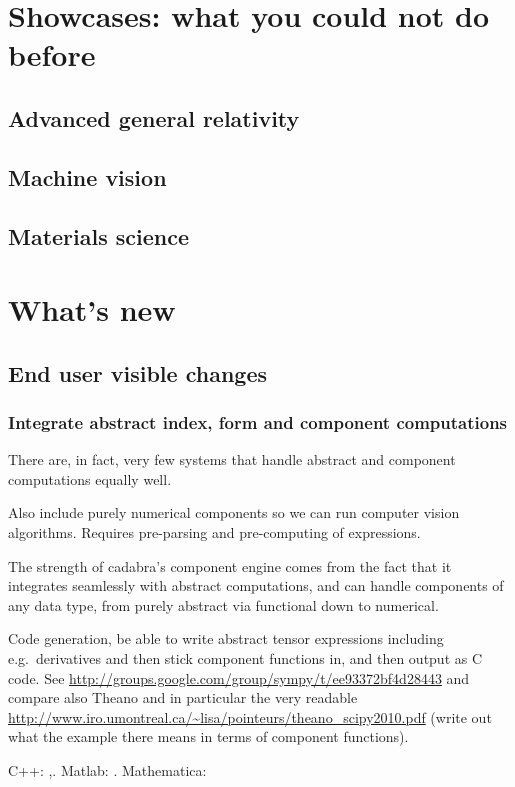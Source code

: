 \documentclass[11pt]{article}
\begin{document}
\section{Showcases: what you could not do before}
\subsection{Advanced general relativity}
\subsection{Machine vision}
\subsection{Materials science}

\section{What's new}
\subsection{End user visible changes}
\subsubsection{Integrate abstract index, form and component computations}

There are, in fact, very few systems that handle abstract and
component computations equally well.

Also include purely numerical components so we can run computer vision
algorithms. Requires pre-parsing and pre-computing of expressions.

The strength of cadabra's component engine comes from the fact that it
integrates seamlessly with abstract computations, and can handle
components of any data type, from purely abstract via functional down
to numerical.

Code generation, be able to write abstract tensor expressions
including e.g.~derivatives and then stick component functions in, and
then output as C code. See
\url{http://groups.google.com/group/sympy/t/ee93372bf4d28443}
and compare also Theano and in particular the
very readable \url{http://www.iro.umontreal.ca/~lisa/pointeurs/theano_scipy2010.pdf}
(write out what the example there means in terms of component functions).

C++: \cite{ltensor},\cite{ftensor}.
Matlab: \cite{TTB_Software}.
Mathematica: \cite{kranc}
\end{document}
